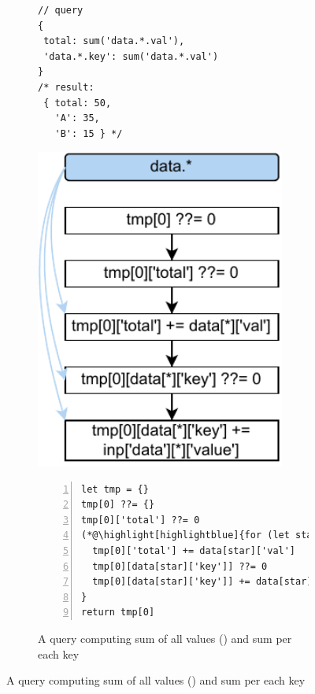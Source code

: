 \documentclass[runningheads]{llncs}
\begin{document}
\begin{figure}[t!]
\begin{subfigure}{\textwidth}
\begin{minipage}{0.25\textwidth}
\begin{lstlisting}[style=JavaScript, columns=flexible]
// query
{
 total: sum('data.*.val'),
 'data.*.key': sum('data.*.val')
}
/* result:
 { total: 50, 
   'A': 35,
   'B': 15 } */
\end{lstlisting}
\end{minipage}
\begin{minipage}{0.21\textwidth}
\centering
\includegraphics[width=0.9\textwidth]{images/intro_q2_ir.pdf}
\end{minipage}
\begin{minipage}{0.54\textwidth}
\begin{lstlisting}[style=JavaScript, columns=flexible, numbers=left, xleftmargin=2pt]
let tmp = {}
tmp[0] ??= {}
tmp[0]['total'] ??= 0
(*@\highlight[highlightblue]{for (let star in data) }@*) {
  tmp[0]['total'] += data[star]['val']
  tmp[0][data[star]['key']] ??= 0
  tmp[0][data[star]['key']] += data[star]['value']
}
return tmp[0]
\end{lstlisting}
\end{minipage}
\caption{A query computing sum of all values
() and sum per each key}\label{fig:intro_q2}
\end{subfigure}


\end{figure}
\end{document}
